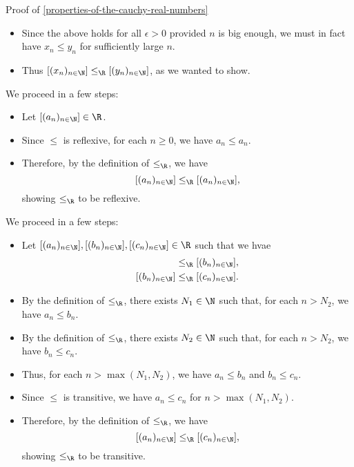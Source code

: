\begin{Proof}{Proof of \cref{properties-of-the-cauchy-real-numbers}}
\begin{itemize}
\begin{align*}
                      &=     y_{n}+(b_{n}-y_{n})+\epsilon\\
                      &\leq  y_{n}+\abs{b_{n}-y_{n}}+\epsilon\\
                      &=     y_{n}+\abs{y_{n}-b_{n}}+\epsilon\\
                      &\less y_{n}+2\epsilon
            \end{align*}
            for all $n\geq\max(N_{a},N_{b})$.
        \item Since the above holds for all $\epsilon\greater0$ provided $n$ is big enough, we must in fact have $x_{n}\leq y_{n}$ for sufficiently large $n$.
        \item Thus $[(x_{n})_{n\in\N}]\leq_{\R}[(y_{n})_{n\in\N}]$, as we wanted to show.
    \end{itemize}

    We proceed in a few steps:
    \begin{itemize}
        \item Let $[(a_{n})_{n\in\N}]\in\R$.
        \item Since $\leq$ is reflexive, for each $n\geq0$, we have $a_{n}\leq a_{n}$.
        \item Therefore, by the definition of $\leq_{\R}$, we have
            \[
                [(a_{n})_{n\in\N}]%
                \leq_{\R}%
                [(a_{n})_{n\in\N}],%
            \]%
            showing $\leq_{\R}$ to be reflexive.
    \end{itemize}

    We proceed in a few steps:
    \begin{itemize}
        \item Let $[(a_{n})_{n\in\N}],[(b_{n})_{n\in\N}],[(c_{n})_{n\in\N}]\in\R$ such that we hvae
            \begin{align*}
                [(a_{n})_{n\in\N}] &\leq_{\R} [(b_{n})_{n\in\N}],\\
                [(b_{n})_{n\in\N}] &\leq_{\R} [(c_{n})_{n\in\N}].
            \end{align*}
        \item By the definition of $\leq_{\R}$, there exists $N_{1}\in\N$ such that, for each $n\greater N_{2}$, we have $a_{n}\leq b_{n}$.
        \item By the definition of $\leq_{\R}$, there exists $N_{2}\in\N$ such that, for each $n\greater N_{2}$, we have $b_{n}\leq c_{n}$.
        \item Thus, for each $n\greater\max(N_{1},N_{2})$, we have $a_{n}\leq b_{n}$ and $b_{n}\leq c_{n}$.
        \item Since $\leq$ is transitive, we have $a_{n}\leq c_{n}$ for $n\greater\max(N_{1},N_{2})$.
        \item Therefore, by the definition of $\leq_{\R}$, we have
            \[
                [(a_{n})_{n\in\N}]%
                \leq_{\R}%
                [(c_{n})_{n\in\N}],%
            \]%
            showing $\leq_{\R}$ to be transitive.
    \end{itemize}


\end{Proof}

